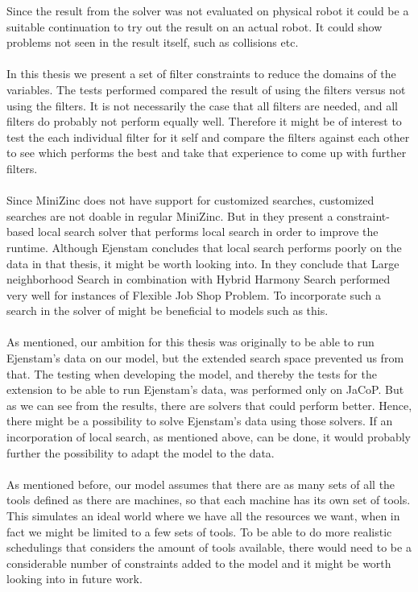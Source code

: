 Since the result from the solver was not evaluated on physical robot it could be a suitable continuation to try out the result on an actual robot. It could show problems not seen in the result itself, such as collisions etc.
\\\\
In this thesis we present a set of filter constraints to reduce the domains of the variables. The tests performed compared the result of using the filters versus not using the filters. It is not necessarily the case that all filters are needed, and all filters do probably not perform equally well. Therefore it might be of interest to test the each individual filter for it self and compare the filters against each other to see which performs the best and take that experience to come up with further filters.
\\\\
Since MiniZinc does not have support for customized searches, customized searches are not doable in regular MiniZinc. But in \cite{Bjordal} they present a constraint-based local search solver that performs local search in order to improve the runtime. Although Ejenstam concludes that local search performs poorly on the data in that thesis, it might be worth looking into. In \cite{yuan_2013} they conclude that Large neighborhood Search in combination with Hybrid Harmony Search performed very well for instances of Flexible Job Shop Problem. To incorporate such a search in the solver of \cite{Bjordal} might be beneficial to models such as this.
\\\\
As mentioned, our ambition for this thesis was originally to be able to run Ejenstam's data on our model, but the extended search space prevented us from that. The testing when developing the model, and thereby the tests for the extension to be able to run Ejenstam's data, was performed only on JaCoP. But as we can see from the results, there are solvers that could perform better. Hence, there might be a possibility to solve Ejenstam's data using those solvers. If an incorporation of local search, as mentioned above, can be done, it would probably further the possibility to adapt the model to the data.
\\\\
As mentioned before, our model assumes that there are as many sets of all the tools defined as there are machines, so that each machine has its own set of tools. This simulates an ideal world where we have all the resources we want, when in fact we might be limited to a few sets of tools. To be able to do more realistic schedulings that considers the amount of tools available, there would need to be a considerable number of constraints added to the model and it might be worth looking into in future work.